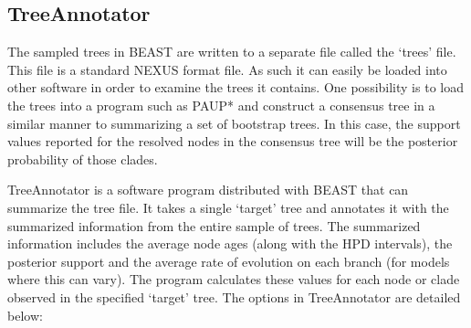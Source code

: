 \documentclass[11pt]{article}
\theoremstyle{plain}%
\theoremstyle{definition}
\theoremstyle{remark}
\begin{document}
\subsection*{TreeAnnotator}

The sampled trees in BEAST are written to a separate file called the `trees' file. This file is a
standard NEXUS format file. As such it can easily be loaded into other software in order to examine the trees it contains. One
possibility is to load the trees into a program such as PAUP* and construct a consensus tree in a similar manner to
summarizing a set of bootstrap trees. In this case, the support values reported for the resolved nodes in the consensus tree
will be the posterior probability of those clades.

TreeAnnotator is a software program distributed with BEAST that can summarize the tree file. 
It takes a single `target' tree and annotates it with the summarized information from the entire sample of trees.
The summarized information includes the average node ages (along with the HPD intervals), the posterior support and the
average rate of evolution on each branch (for models where this can vary). The program calculates these values for each
node or clade observed in the specified `target' tree. The options in TreeAnnotator are detailed below:
\end{document}
